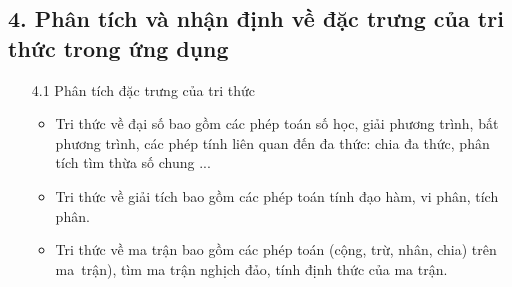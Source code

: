 \documentclass[a4paper]{article}
\begin{document}
 \subsection*{4. Phân tích và nhận định về đặc trưng của tri thức trong ứng dụng}

\begin{enumerate}
\item [4.1] Phân tích đặc trưng của tri thức
\begin{itemize}
\item Tri thức về đại số bao gồm các phép toán số học, giải phương trình, bất phương trình, các phép tính liên quan đến đa thức: chia đa thức, phân tích tìm thừa số chung ... 
\item Tri thức về giải tích bao gồm các phép toán tính đạo hàm, vi phân, tích phân.
\item Tri thức về ma trận bao gồm các phép toán (cộng, trừ, nhân, chia) trên ma~trận), tìm ma trận nghịch đảo, tính định thức của ma trận.
\end{itemize}


\end{enumerate}
\end{document}
